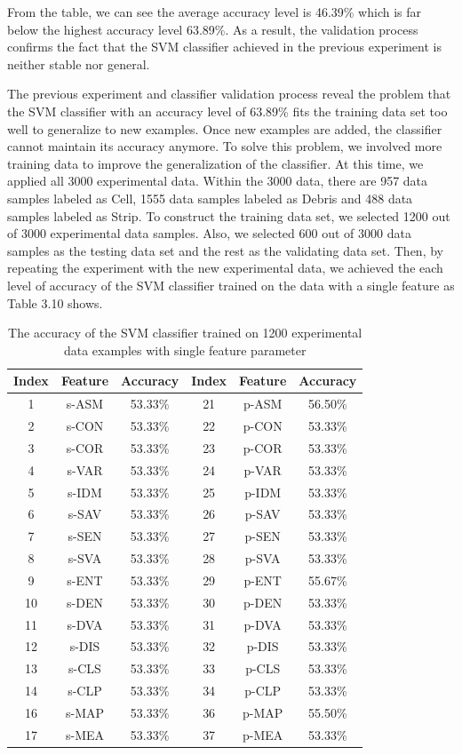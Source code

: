From the table, we can see the average accuracy level is 46.39\% which is far below the highest accuracy level 63.89\%. As a result, the validation process confirms the fact that the SVM classifier achieved in the previous experiment is neither stable nor general. \par
The previous experiment and classifier validation process reveal the problem that the SVM classifier with an accuracy level of 63.89\% fits the training data set too well to generalize to new examples. Once new examples are added, the classifier cannot maintain its accuracy anymore. To solve this problem, we involved more training data to improve the generalization of the classifier. At this time, we applied all 3000 experimental data. Within the 3000 data, there are 957 data samples labeled as Cell, 1555 data samples labeled as Debris and 488 data samples labeled as Strip. To construct the training data set, we selected 1200 out of 3000 experimental data samples. Also, we selected 600 out of 3000 data samples as the testing data set and the rest as the validating data set. Then, by repeating the experiment with the new experimental data, we achieved the each level of accuracy of the SVM classifier trained on the data with a single feature as Table 3.10 shows. 
\begin{table}[!h]
\begin{center}
\renewcommand{\arraystretch}{0.5}
\begin{tabular}{||c c c c c c ||}
\hline
Index & Feature & Accuracy & Index & Feature & Accuracy \\[0.7ex]
\hline\hline
1 & s-ASM & 53.33\% & 21 & p-ASM & 56.50\% \\
2 & s-CON & 53.33\% & 22 & p-CON & 53.33\% \\
3 & s-COR & 53.33\% & 23 & p-COR & 53.33\% \\
4 & s-VAR & 53.33\% & 24 & p-VAR & 53.33\% \\
5 & s-IDM & 53.33\% & 25 & p-IDM & 53.33\% \\
6 & s-SAV & 53.33\% & 26 & p-SAV & 53.33\% \\
7 & s-SEN & 53.33\% & 27 & p-SEN & 53.33\% \\
8 & s-SVA & 53.33\% & 28 & p-SVA & 53.33\% \\
9 & s-ENT & 53.33\% & 29 & p-ENT & 55.67\% \\
10 & s-DEN & 53.33\% & 30 & p-DEN & 53.33\% \\
11 & s-DVA & 53.33\% & 31 & p-DVA & 53.33\% \\
12 & s-DIS & 53.33\% & 32 & p-DIS & 53.33\% \\
13 & s-CLS & 53.33\% & 33 & p-CLS & 53.33\% \\
14 & s-CLP & 53.33\% & 34 & p-CLP & 53.33\% \\
16 & s-MAP & 53.33\% & 36 & p-MAP & 55.50\% \\
17 & s-MEA & 53.33\% & 37 & p-MEA & 53.33\% \\
\hline
\end{tabular}
\caption {The accuracy of the SVM classifier trained on 1200 experimental data examples with single feature parameter}
\end{center}
\end{table}
